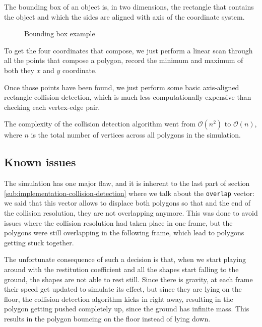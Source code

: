 The bounding box of an object is, in two dimensions, the rectangle that contains
the object and which the sides are aligned with axis of the coordinate system.

\begin{figure}[H]
	\centering
	\caption{Bounding box example}
	\label{fig:bounding-box}
\end{figure}

To get the four coordinates that compose, we just perform a linear scan through
all the points that compose a polygon, record the minimum and maximum of both
they $x$ and $y$ coordinate.

Once those points have been found, we just perform some basic axis-aligned
rectangle collision detection, which is much less computationally expensive than
checking each vertex-edge pair.

The complexity of the collision detection algorithm went from $\mathcal{O}(n^2)$
to $\mathcal{O}(n)$, where $n$ is the total number of vertices across all
polygons in the simulation.


\subsection{Known issues}

The simulation has one major flaw, and it is inherent to the last part of
section \ref{sub:implementation-collision-detection} where we talk about the
\lstinline{overlap} vector: we said that this vector allows to displace both
polygons so that and the end of the collision resolution, they are not
overlapping anymore. This was done to avoid issues where the collision
resolution had taken place in one frame, but the polygons were still overlapping
in the following frame, which lead to polygons getting stuck together.

The unfortunate consequence of such a decision is that, when we start playing
around with the restitution coefficient and all the shapes start falling to the
ground, the shapes are not able to rest still. Since there is gravity, at each
frame their speed get updated to simulate its effect, but since they are lying
on the floor, the collision detection algorithm kicks in right away, resulting
in the polygon getting pushed completely up, since the ground has infinite mass.
This results in the polygon bouncing on the floor instead of lying down.
